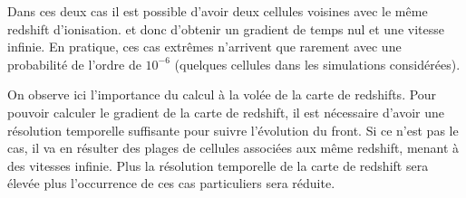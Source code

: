 Dans ces deux cas il est possible d'avoir deux cellules voisines avec le même redshift d'ionisation. et donc d'obtenir un gradient de temps nul et une vitesse infinie.
En pratique, ces cas extrêmes n'arrivent que rarement avec une probabilité de l'ordre de $10^{-6}$ (quelques cellules dans les simulations considérées).

On observe ici l'importance du calcul à la volée de la carte de redshifts.
Pour pouvoir calculer le gradient de la carte de redshift, il est nécessaire d'avoir une résolution temporelle suffisante pour suivre l'évolution du front.
Si ce n'est pas le cas, il va en résulter des plages de cellules associées aux même redshift, menant à des vitesses infinie.
Plus la résolution temporelle de la carte de redshift sera élevée plus l’occurrence de ces cas particuliers sera réduite.






